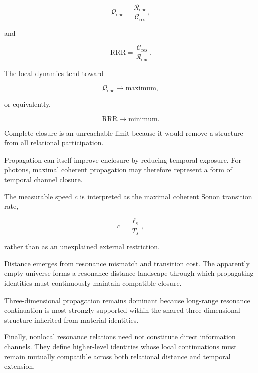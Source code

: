 \documentclass[11pt,a4paper]{article}
\begin{document}
\begin{equation}
    \mathcal{Q}_{\mathrm{enc}}
    =
    \frac{\mathcal{R}_{\mathrm{enc}}}
         {\mathcal{C}_{\mathrm{res}}},
\end{equation}

and

\begin{equation}
    \mathrm{RRR}
    =
    \frac{\mathcal{C}_{\mathrm{res}}}
         {\mathcal{R}_{\mathrm{enc}}}.
\end{equation}

The local dynamics tend toward

\begin{equation}
    \mathcal{Q}_{\mathrm{enc}}
    \rightarrow \mathrm{maximum},
\end{equation}

or equivalently,

\begin{equation}
    \mathrm{RRR}
    \rightarrow \mathrm{minimum}.
\end{equation}

Complete closure is an unreachable limit because it would remove a structure from all relational participation.

Propagation can itself improve enclosure by reducing temporal exposure. For photons, maximal coherent propagation may therefore represent a form of temporal channel closure.

The measurable speed $c$ is interpreted as the maximal coherent Sonon transition rate,

\begin{equation}
    c
    =
    \frac{\ell_s}{T_s},
\end{equation}

rather than as an unexplained external restriction.

Distance emerges from resonance mismatch and transition cost. The apparently empty universe forms a resonance-distance landscape through which propagating identities must continuously maintain compatible closure.

Three-dimensional propagation remains dominant because long-range resonance continuation is most strongly supported within the shared three-dimensional structure inherited from material identities.

Finally, nonlocal resonance relations need not constitute direct information channels. They define higher-level identities whose local continuations must remain mutually compatible across both relational distance and temporal extension.
\end{document}
